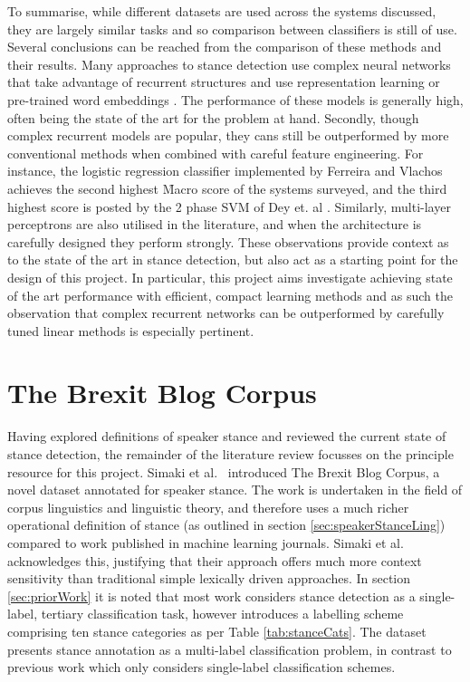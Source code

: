\documentclass[Dissertation.tex]{subfiles}
\begin{document}
To summarise, while different datasets are used across the systems discussed, they are largely similar tasks and so comparison between classifiers is still of use. Several conclusions can be reached from the comparison of these methods and their results. Many approaches to stance detection use complex neural networks that take advantage of recurrent structures and use representation learning or pre-trained word embeddings  \cite{augensteinStanceDetectionBidirectional2016,duStanceClassificationTargetspecific, deyTopicalStanceDetection2018,zarrellaMITRESemEval2016Task2016,largentTalosTargetsDisinformation,weiPkudblabSemEval2016Task2016}.  The performance of these models is generally high, often being the state of the art for the problem at hand. Secondly, though complex recurrent models are popular, they cans still be outperformed by more conventional methods when combined with careful feature engineering. For instance, the logistic regression classifier implemented by Ferreira and Vlachos achieves the second highest \f{Macro} score of the systems surveyed, and the third highest score is posted by the 2 phase SVM of Dey et. al \cite{deyTwitterStanceDetection2017}. Similarly, multi-layer perceptrons are also utilised in the literature, and when the architecture is carefully designed they perform  strongly. These observations provide context as to the state of the art in stance detection, but also act as a starting point for the design of this project. In particular, this project aims investigate achieving state of the art performance with efficient, compact learning methods and as such the observation that complex recurrent networks can be outperformed by carefully tuned linear methods is especially pertinent.

\section{The Brexit Blog Corpus}\label{BBC}

Having explored definitions of speaker stance and reviewed the current state of stance detection, the remainder of the literature review focusses on the principle resource for this project. Simaki et al.\ \cite{simakiAnnotatingSpeakerStance2017} introduced The Brexit Blog Corpus, a novel dataset annotated for speaker stance. The work is undertaken in the field of corpus linguistics and linguistic theory, and therefore uses a much richer operational definition of stance (as outlined in section \ref{sec:speakerStanceLing}) compared to work published in machine learning journals. Simaki et al.\ \cite{simakiAnnotatingSpeakerStance2017} acknowledges this, justifying that their approach offers much more context sensitivity than traditional simple lexically driven approaches. In section \ref{sec:priorWork} it is noted that most work considers stance detection as a single-label, tertiary classification task, however \cite{simakiAnnotatingSpeakerStance2017} introduces a labelling scheme comprising ten stance categories as per Table \ref{tab:stanceCats}. The dataset presents stance annotation as a multi-label classification problem, in contrast to previous work which only considers single-label classification schemes. 
\end{document}
